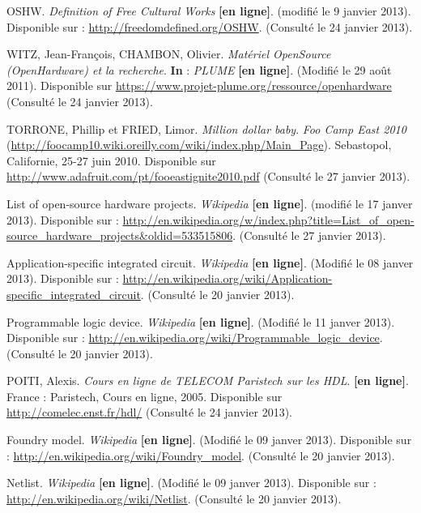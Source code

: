\documentclass{report}
\begin{document}
\begin{thebibliography}{1}
OSHW. \textit{Definition of Free Cultural Works} \textbf{[en ligne]}. (modifié le 9 janvier 2013). Disponible sur : \url{http://freedomdefined.org/OSHW}. (Consulté le 24 janvier 2013).

WITZ, Jean-François, CHAMBON, Olivier. \textit{Matériel OpenSource (OpenHardware) et la recherche}. \textbf{In} : \textit{PLUME} \textbf{[en ligne]}. (Modifié le 29 août 2011). Disponible sur \url{https://www.projet-plume.org/ressource/openhardware} (Consulté le 24 janvier 2013).

TORRONE, Phillip et FRIED, Limor. \textit{Million dollar baby}. \textit{Foo Camp East 2010} (\url{http://foocamp10.wiki.oreilly.com/wiki/index.php/Main\_Page}). Sebastopol, Californie, 25-27 juin 2010. Disponible sur \url{http://www.adafruit.com/pt/fooeastignite2010.pdf} (Consulté le 27 janvier 2013).

List of open-source hardware projects. \textit{Wikipedia} \textbf{[en ligne]}. (modifié le 17 janver 2013). Disponible sur : \url{http://en.wikipedia.org/w/index.php?title=List\_of\_open-source\_hardware\_projects\&oldid=533515806}. (Consulté le 27 janvier 2013).


Application-specific integrated circuit. \textit{Wikipedia} \textbf{[en ligne]}. (Modifié le 08 janver 2013). Disponible sur : \url{http://en.wikipedia.org/wiki/Application-specific\_integrated\_circuit}. (Consulté le 20 janvier 2013).

Programmable logic device. \textit{Wikipedia} \textbf{[en ligne]}. (Modifié le 11 janver 2013). Disponible sur : \url{http://en.wikipedia.org/wiki/Programmable\_logic\_device}. (Consulté le 20 janvier 2013).

POITI, Alexis. \textit{Cours en ligne de {TELECOM} Paristech sur les {HDL}}. \textbf{[en ligne]}. France : Paristech, Cours en ligne, 2005. Disponible sur \url{http://comelec.enst.fr/hdl/} (Consulté le 24 janvier 2013).

Foundry model. \textit{Wikipedia} \textbf{[en ligne]}. (Modifié le 09 janver 2013). Disponible sur : \url{http://en.wikipedia.org/wiki/Foundry\_model}. (Consulté le 20 janvier 2013).

Netlist. \textit{Wikipedia} \textbf{[en ligne]}. (Modifié le 09 janver 2013). Disponible sur : \url{http://en.wikipedia.org/wiki/Netlist}. (Consulté le 20 janvier 2013).


\end{thebibliography}
\end{document}
